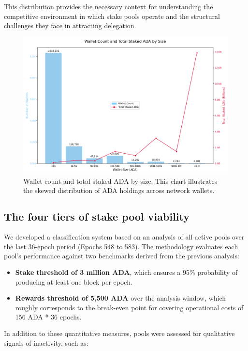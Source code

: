 \documentclass[11pt, letterpaper]{article}
\begin{document}
This distribution provides the necessary context for understanding the
competitive environment in which stake pools operate and the structural
challenges they face in attracting delegation.

\begin{figure}[H]
	\centering
	\includegraphics[width=\textwidth]{img/wallet_distribution_combined_corrected.png}
	\caption{Wallet count and total staked ADA by size. This chart illustrates the skewed distribution of
		ADA holdings across network wallets.}\label{fig:wallet-dist}
\end{figure}

\subsection{The four tiers of stake pool viability}

We developed a classification system based on an analysis of all active pools
over the last 36-epoch period (Epochs 548 to 583). The methodology evaluates
each pool's performance against two benchmarks derived from the previous
analysis:

\begin{itemize}
	\item \textbf{Stake threshold of 3 million ADA}, which ensures a 95\% probability of producing at least
	      one block per epoch.
	\item \textbf{Rewards threshold of 5,500 ADA} over the analysis window, which roughly corresponds to the break-even
	      point for covering operational costs of 156 ADA * 36 epochs.
\end{itemize}

In addition to these quantitative measures, pools were assessed for qualitative
signals of inactivity, such as:
\end{document}
